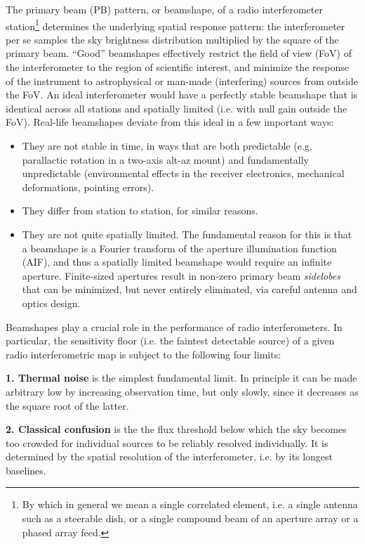 \documentclass{aa}
\begin{document}
The primary beam (PB) pattern, or beamshape, of a radio interferometer station\footnote{By which in general we mean a single correlated element, i.e. a single antenna such as a steerable dish, or a single compound beam of an aperture array or a phased array feed.} determines the underlying spatial response pattern: the interferometer per se samples the sky brightness distribution multiplied by the square of the primary beam. ``Good'' beamshapes effectively restrict the field of view (FoV) of the interferometer to the region of scientific interest, and minimize the response of the instrument to astrophysical or man-made (interfering) sources from outside the FoV. An ideal interferometer would have a perfectly stable beamshape that is identical across all stations and spatially limited (i.e. with null gain outside the FoV). Real-life beamshapes deviate from this ideal in a few important ways:

\begin{itemize}
\item They are not stable in time, in ways that are both predictable (e.g. parallactic rotation in a two-axis alt-az mount) and fundamentally unpredictable (environmental effects in the receiver electronics, mechanical deformations, pointing errors).
\item They differ from station to station, for similar reasons.
\item They are not quite spatially limited. The fundamental reason for this is that a beamshape is a Fourier transform of the aperture illumination function (AIF), and thus a spatially limited beamshape would require an infinite aperture. Finite-sized apertures result in non-zero primary beam \emph{sidelobes} that can be minimized, but never entirely eliminated, via careful antenna and optics design.
\end{itemize}

Beamshapes play a crucial role in the performance of radio interferometers. In particular, the sensitivity floor (i.e. the faintest detectable source) of a given radio interferometric map is subject to the following four limits:

{\bf 1. Thermal noise} is the simplest fundamental limit. In principle it can be made arbitrary low by increasing observation time, but only slowly, since it decreases as the square root of the latter.

{\bf 2. Classical confusion} is the the flux threshold below which the sky becomes too crowded for individual sources to be reliably resolved individually. It is determined by the spatial resolution of the interferometer, i.e. by its longest baselines.
\end{document}
